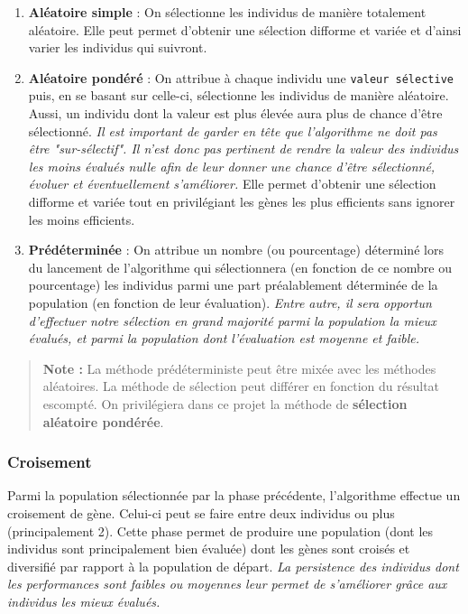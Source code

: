 \begin{enumerate}
\def\labelenumi{\arabic{enumi}.}
\tightlist
\item
  \textbf{Aléatoire simple} : On sélectionne les individus de manière
  totalement aléatoire. Elle peut permet d'obtenir une sélection
  difforme et variée et d'ainsi varier les individus qui suivront.
\item
  \textbf{Aléatoire pondéré} : On attribue à chaque individu une
  \texttt{valeur\ sélective} puis, en se basant sur celle-ci,
  sélectionne les individus de manière aléatoire. Aussi, un individu
  dont la valeur est plus élevée aura plus de chance d'être sélectionné.
  \emph{Il est important de garder en tête que l'algorithme ne doit pas
  être "sur-sélectif". Il n'est donc pas pertinent de rendre la valeur
  des individus les moins évalués nulle afin de leur donner une chance
  d'être sélectionné, évoluer et éventuellement s'améliorer.} Elle
  permet d'obtenir une sélection difforme et variée tout en privilégiant
  les gènes les plus efficients sans ignorer les moins efficients.
\item
  \textbf{Prédéterminée} : On attribue un nombre (ou pourcentage)
  déterminé lors du lancement de l'algorithme qui sélectionnera (en
  fonction de ce nombre ou pourcentage) les individus parmi une part
  préalablement déterminée de la population (en fonction de leur
  évaluation). \emph{Entre autre, il sera opportun d'effectuer notre
  sélection en grand majorité parmi la population la mieux évalués, et
  parmi la population dont l'évaluation est moyenne et faible.}
\end{enumerate}

\begin{quote}
\textbf{Note :} La méthode prédéterministe peut être mixée avec les
méthodes aléatoires. La méthode de sélection peut différer en fonction
du résultat escompté. On privilégiera dans ce projet la méthode de
\textbf{sélection aléatoire pondérée}.
\end{quote}

\hypertarget{croisement}{%
\subsubsection{Croisement}\label{croisement}}

Parmi la population sélectionnée par la phase précédente, l'algorithme
effectue un croisement de gène. Celui-ci peut se faire entre deux
individus ou plus (principalement 2). Cette phase permet de produire une
population (dont les individus sont principalement bien évaluée) dont
les gènes sont croisés et diversifié par rapport à la population de
départ. \emph{La persistence des individus dont les performances sont
faibles ou moyennes leur permet de s'améliorer grâce aux individus les
mieux évalués.}

